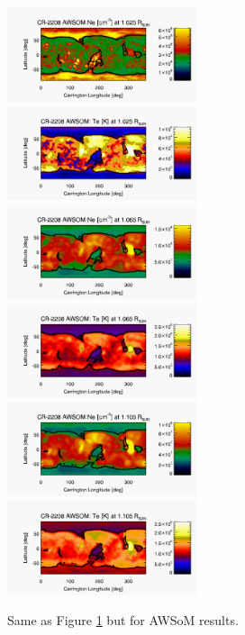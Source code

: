 \documentclass[namedreferences]{solarphysics}
\begin{document}
\begin{article}
\begin{figure}[h!]
\begin{center}
\includegraphics[width=0.495\textwidth]{figs/map_Ne_awsom_2208_185_short_1025_Rsun.pdf}
\includegraphics[width=0.495\textwidth]{figs/map_Te_awsom_2208_185_short_1025_Rsun.pdf}
\includegraphics[width=0.495\textwidth]{figs/map_Ne_awsom_2208_185_short_1065_Rsun.pdf}
\includegraphics[width=0.495\textwidth]{figs/map_Te_awsom_2208_185_short_1065_Rsun.pdf}
\includegraphics[width=0.495\textwidth]{figs/map_Ne_awsom_2208_185_short_1105_Rsun.pdf}
\includegraphics[width=0.495\textwidth]{figs/map_Te_awsom_2208_185_short_1105_Rsun.pdf}
\caption{Same as Figure \ref{carmaps_awsom_2208} but for AWSoM results.}
\label{carmaps_awsom_2208}
\end{center}
\end{figure}


\end{article}
\end{document}
